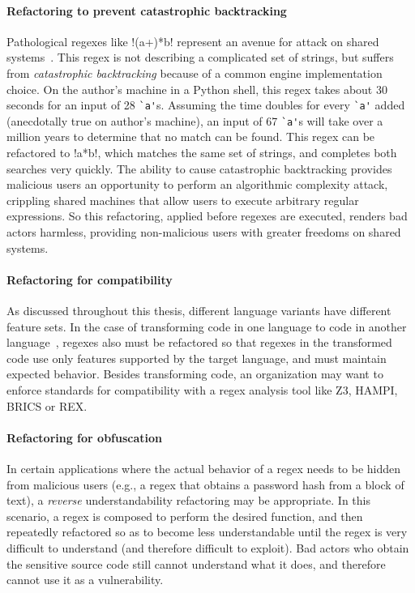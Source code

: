\paragraph{Refactoring to prevent catastrophic backtracking}  Pathological regexes like \cverb!(a+)*b! represent an avenue for attack on shared systems~.  This regex is not describing a complicated set of strings, but suffers from \emph{catastrophic backtracking} because of a common engine implementation choice.  On the author's machine in a Python shell, this regex takes about 30 seconds for an input of 28 \verb!`a'!s. Assuming the time doubles for every \verb!`a'! added (anecdotally true on author's machine), an input of 67 \verb!`a'!s will take over a million years to determine that no match can be found.  This regex can be refactored to \cverb!a*b!, which matches the same set of strings, and completes both searches very quickly.  The ability to cause catastrophic backtracking provides malicious users an opportunity to perform an algorithmic complexity attack, crippling shared machines that allow users to execute arbitrary regular expressions.  So this refactoring, applied before regexes are executed, renders bad actors harmless, providing non-malicious users with greater freedoms on shared systems.

\paragraph{Refactoring for compatibility}  As discussed throughout this thesis, different language variants have different feature sets.  In the case of transforming code in one language to code in another language~, regexes also must be refactored so that regexes in the transformed code use only features supported by the target language, and must maintain expected behavior.  Besides transforming code, an organization may want to enforce standards for compatibility with a regex analysis tool like Z3, HAMPI, BRICS or REX.

\paragraph{Refactoring for obfuscation}  In certain applications where the actual behavior of a regex needs to be hidden from malicious users (e.g., a regex that obtains a password hash from a block of text), a \emph{reverse} understandability refactoring may be appropriate.  In this scenario, a regex is composed to perform the desired function, and then repeatedly refactored so as to become less understandable until the regex is very difficult to understand (and therefore difficult to exploit).  Bad actors who obtain the sensitive source code still cannot understand what it does, and therefore cannot use it as a vulnerability.

